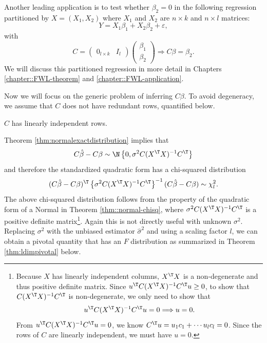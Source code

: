 \begin{example}\label{eg::partition-reg-F}
Another
leading application is to test whether $\beta_{2}=0$ in the following
regression partitioned by $X=(X_{1},X_{2})$ where $X_{1}$ and $X_{2}$
are $n\times k$ and $n\times l$ matrices:
\[
Y=X_{1}\beta_{1}+X_{2}\beta_{2}+\varepsilon,
\]
 with
\[
C=\left(\begin{array}{cc}
0_{l\times k} & I_{l}\end{array}\right)\left(\begin{array}{c}
\beta_{1}\\
\beta_{2}
\end{array}\right)\Longrightarrow C\beta=\beta_{2}.
\]
 We will discuss this partitioned regression in more detail in Chapters \ref{chapter::FWL-theorem} and \ref{chapter::FWL-application}.
 \end{example}
 
Now we will focus on the generic problem of inferring $C\beta$.
To avoid degeneracy, we assume that $C$ does not have redundant rows, quantified below. 

\begin{assumption}\label{assume::c-non-degenerate}
 $C$ has linearly independent
rows. 
\end{assumption}


Theorem \ref{thm:normalexactdistribution} implies that 
\[
C\hat{\beta}-C\beta\sim\N\left\{ 0,\sigma^{2}C(X^{\T}X)^{-1}C^{\T}\right\} 
\]
and therefore the standardized quadratic form has a chi-squared distribution
\[
(C\hat{\beta}-C\beta)^{\T}\left\{ \sigma^{2}C(X^{\T}X)^{-1}C^{\T}\right\} ^{-1}(C\hat{\beta}-C\beta)\sim\chi_{l}^{2}.
\]
The above chi-squared distribution follows from the property of the quadratic form of a Normal in Theorem \ref{thm::normal-chisq}, where $\sigma^{2}C(X^{\T}X)^{-1}C^{\T}$ is a positive definite matrix\footnote{Because $X$ has linearly independent columns, $X^{\T}X$ is a non-degenerate and thus positive definite
matrix. Since $ u^{\T} C(X^{\T}X)^{-1}C^{\T}u \geq 0$, to show that $C(X^{\T}X)^{-1}C^{\T}$ is non-degenerate, we only need to show that 
$$
u^{\T} C(X^{\T}X)^{-1}C^{\T}u  = 0  \Longrightarrow u = 0. 
$$
From $u^{\T} C(X^{\T}X)^{-1}C^{\T}u  = 0$, we know  $C^{\T}u = u_1 c_1 + \cdots u_l c_l = 0$. Since the rows of $C$ are linearly independent, we must have $u = 0$. }.
Again this is not directly useful with unknown $\sigma^{2}.$ Replacing
$\sigma^{2}$ with the unbiased estimator $\hat{\sigma}^{2}$ and
using a scaling factor $l$, we can obtain a pivotal quantity that
has an $F$ distribution as summarized in  Theorem \ref{thm:ldimpivotal} below.

